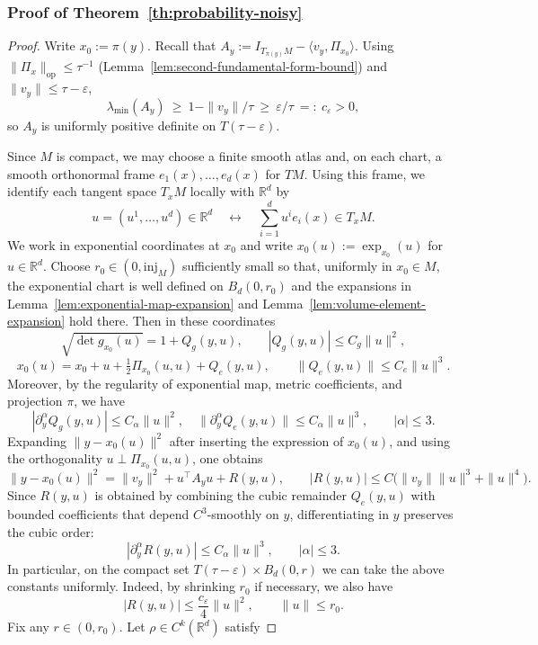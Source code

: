 \documentclass[11pt]{article}
\theoremstyle{plain}
\theoremstyle{definition}
\begin{document}
\subsubsection{Proof of Theorem~\ref{th:probability-noisy}}\label{sec:pf-probability noisy}
\begin{proof}
Write $x_0:=\pi(y)$. Recall that $A_y:=I_{T_{\pi(y)}M}-\langle v_y,\Pi_{x_0}\rangle$. Using $\|\Pi_{x}\|_{\mathrm{op}}\le \tau^{-1}$ (Lemma~\ref{lem:second-fundamental-form-bound}) and $\|v_y\|\le \tau-\varepsilon$,
\[
\lambda_{\min}(A_y)\ \ge\ 1-\|v_y\|/\tau\ \ge\ \varepsilon/\tau\ =:\ c_\varepsilon>0,
\]
so $A_y$ is uniformly positive definite on $T(\tau-\varepsilon)$. 

Since $M$ is compact, we may choose a finite smooth atlas and, on each chart, a smooth orthonormal frame
$e_1(x),\dots,e_d(x)$ for $TM$. Using this frame, we identify each tangent space $T_xM$ locally with
$\mathbb R^d$ by
\[
u=(u^1,\dots,u^d)\in\mathbb R^d 
\quad\longleftrightarrow\quad
\sum_{i=1}^d u^i e_i(x)\in T_xM.
\]
We work in exponential coordinates at $ x_0$ and write $x_0(u):=\exp_{x_0}(u)$ for $u\in \mathbb R^d$. Choose $r_0\in(0,\mathrm{inj}_M)$ sufficiently small so that, uniformly in $x_0\in M$, the exponential chart is well defined on $B_d(0,r_0)$ and the expansions in Lemma~\ref{lem:exponential-map-expansion} and Lemma~\ref{lem:volume-element-expansion} hold there. Then in these coordinates
\[
\sqrt{\det g_{x_0}(u)}=1+Q_g(y,u),\qquad |Q_g(y,u)|\le C_g\|u\|^2, 
\]
\[
x_0(u)=x_0+u+\tfrac12\Pi_{x_0}(u,u)+Q_e(y,u),\qquad \|Q_e(y,u)\|\le C_e\|u\|^3.
\] 
Moreover, by the regularity of exponential map, metric coefficients, and projection $\pi$, we have
\[
|\partial_y^\alpha Q_g(y,u)|\le C_\alpha \|u\|^2,
\quad
\|\partial_y^\alpha Q_e(y,u)\|\le C_\alpha \|u\|^3,\qquad |\alpha|\le3.
\]
Expanding $\|y-x_0(u)\|^2$ after inserting the expression of $x_0(u)$, and using the orthogonality $u\perp \Pi_{x_0}(u,u)$, one obtains
\[
\|y-x_0(u)\|^2 = \|v_y\|^2 + u^\top A_y u + R(y,u),\qquad |R(y,u)|\le C\big(\|v_y\|\|u\|^3+\|u\|^4\big).
\]
Since $R(y,u)$ is obtained by combining the cubic remainder $Q_e(y,u)$ with bounded coefficients that depend $C^3$-smoothly on $y$, differentiating in $y$ preserves the cubic order:
\[
|\partial_y^\alpha R(y,u)|\le C_\alpha\|u\|^3, \qquad |\alpha|\le3.
\]
In particular, on the compact set $T(\tau-\varepsilon)\times B_d(0,r)$ we can take the above constants uniformly. Indeed, by shrinking $r_0$ if necessary, we also have 
\[
|R(y,u)|\le \frac{c_\varepsilon}{4}\|u\|^2, \qquad \|u\|\le r_0.
\]
Fix any $r\in(0,r_0)$. Let $\rho\in C^k(\mathbb R^d)$ satisfy

\end{proof}
\end{document}
